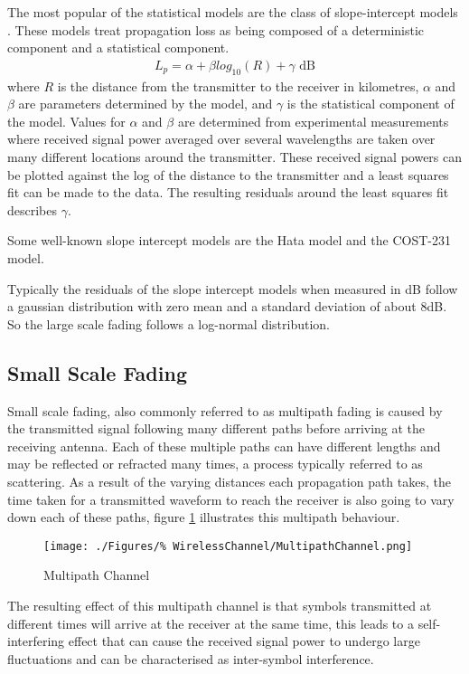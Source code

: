 The most popular of the statistical models are the %
class of slope-intercept models \cite{Jer00}. These %
models treat propagation loss as being composed of %
a deterministic component and a statistical component.
\begin{align}
	L_{p} = \alpha + \beta log_{10}(R) + \gamma \text{ dB}
\end{align}
where $R$ is the distance from the transmitter to the %
receiver in kilometres, $\alpha$ and $\beta$ are parameters %
determined by the model, and $\gamma$ is the %
statistical component of the model. Values for $\alpha$ and %
$\beta$ are determined from experimental measurements %
where received signal power averaged over several %
wavelengths are taken over many different locations %
around the transmitter. These received signal %
powers can be plotted against the log of %
the distance to the transmitter and a least squares fit %
can be made to the data. The resulting residuals around %
the least squares fit describes $\gamma$.

Some well-known slope intercept models are the Hata%
\cite{Hata80} model and the COST-231 model\cite{COST231}.

Typically the residuals  of the slope intercept models %
when measured in dB follow a gaussian distribution with %
zero mean and a standard deviation of about 8dB\cite{Jer00}.
So the large scale fading follows a log-normal distribution.

\subsection{Small Scale Fading}

Small scale fading, also commonly referred to as multipath %
fading is caused by the transmitted signal following many %
different paths before arriving at the receiving antenna. %
Each of these multiple paths can have different lengths %
and may be reflected or refracted many times, a process %
typically referred to as scattering. As a result of the %
varying distances each propagation path takes, the time %
taken for a transmitted waveform to reach the receiver %
is also going to vary down each of these paths, figure %
\ref{fig:MultipathChannel} illustrates this multipath %
behaviour.
\begin{figure}[ht]
	\centering
	\texttt{[image: ./Figures/\%
		WirelessChannel/MultipathChannel.png]}
	\caption{Multipath Channel \cite{Jer00}}
	\label{fig:MultipathChannel}
\end{figure} 
The resulting effect of this multipath channel is that %
symbols transmitted at different times will arrive %
at the receiver at the same time, this leads to %
a self-interfering effect that can cause the received %
signal power to undergo large fluctuations and can %
be characterised as inter-symbol interference.

